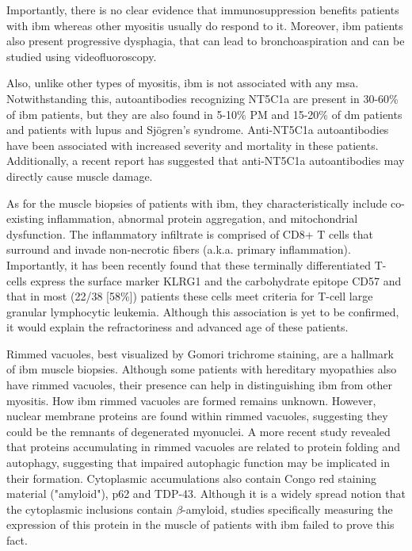 Importantly, there is no clear evidence that immunosuppression benefits patients with \gls{ibm} whereas other myositis usually do respond to it.\cite{SelvaOCallaghan2018} Moreover, \gls{ibm} patients also present progressive dysphagia,\cite{SelvaOCallaghan2018} that can lead to bronchoaspiration and can be studied using videofluoroscopy. 

Also, unlike other types of myositis, \gls{ibm} is not associated with any \gls{msa}. Notwithstanding this, autoantibodies recognizing NT5C1a are present in 30-60\% of \gls{ibm} patients, but they are also found in 5-10\% PM and 15-20\% of \gls{dm} patients and patients with lupus and Sjögren's syndrome.\cite{Lloyd2016,Herbert2016,Muro2017,Lilleker2017} Anti-NT5C1a autoantibodies have been associated with increased severity and mortality in these patients.\cite{Lilleker2017,Goyal2016} Additionally, a recent report has suggested that anti-NT5C1a autoantibodies may directly cause muscle damage.\cite{Tawara2017}

As for the muscle biopsies of patients with \gls{ibm}, they characteristically include co-existing inflammation, abnormal protein aggregation, and mitochondrial dysfunction.\cite{Dalakas2002} The inflammatory infiltrate is comprised of CD8+ T cells that surround and invade non-necrotic fibers (a.k.a. primary inflammation). Importantly, it has been recently found that these terminally differentiated T-cells express the surface marker KLRG1 and the carbohydrate epitope CD57 and that in most (22/38 [58\%]) patients these cells meet criteria for T-cell large granular lymphocytic leukemia.\cite{Greenberg2016,Greenberg2019} Although this association is yet to be confirmed, it would explain the refractoriness and advanced age of these patients.\cite{Greenberg2016,Greenberg2019,Greenberg2019a}

Rimmed vacuoles, best visualized by Gomori trichrome staining, are a hallmark of \gls{ibm} muscle biopsies. Although some patients with hereditary myopathies also have rimmed vacuoles, their presence can help in distinguishing \gls{ibm} from other myositis.\cite{Dalakas2002} How \gls{ibm} rimmed vacuoles are formed remains unknown. However, nuclear membrane proteins are found within rimmed vacuoles, suggesting they could be the remnants of degenerated myonuclei.\cite{Greenberg2006,Nalbantoglu1994} A more recent study revealed that proteins accumulating in rimmed vacuoles are related to protein folding and autophagy, suggesting that impaired autophagic function may be implicated in their formation.\cite{Guttsches2017} Cytoplasmic accumulations also contain Congo red staining material ("amyloid"), p62 and TDP-43.\cite{Dalakas2002} Although it is a widely spread notion that the cytoplasmic inclusions contain $\beta$-amyloid, studies specifically measuring the expression of this protein in the muscle of patients with \gls{ibm} failed to prove this fact.\cite{Greenberg2010,Nalbantoglu1994}


